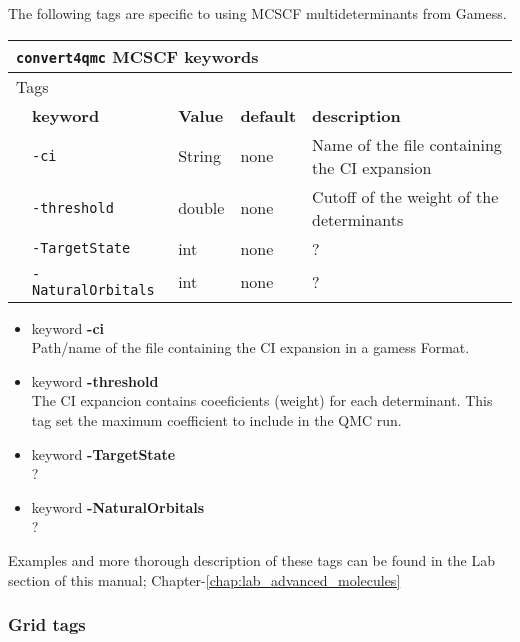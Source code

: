 The following tags are specific to using MCSCF multideterminants from Gamess. 

 \begin{table}[h]
 \begin{center}
 \begin{tabularx}{\textwidth}{l l l l l }
 \hline
 \multicolumn{5}{l}{\texttt{convert4qmc} MCSCF keywords} \\
 \hline
 \multicolumn{2}{l}{Tags}  & \multicolumn{3}{l}{}\\
    &   \bfseries keyword      & \bfseries Value & \bfseries default   & \bfseries description \\
    &   \texttt{-ci    } & String     &   none & Name of the file containing the CI expansion  \\
    &   \texttt{-threshold         } &  double    &  none & Cutoff of the weight of the determinants  \\
    &   \texttt{-TargetState      } & int  &  none & ?  \\
    &   \texttt{-NaturalOrbitals      } &  int      &  none   & ?  \\
    \hline
     \end{tabularx}
 \end{center}
 \end{table}
\begin{itemize}
\item keyword \textbf{-ci}\\
Path/name of the file containing the CI expansion in a gamess Format.
\item keyword \textbf{-threshold}\\
The CI expancion contains coeeficients (weight) for each determinant. This tag set the maximum coefficient to include in the QMC run. 
\item keyword \textbf{-TargetState}\\
?
\item keyword \textbf{-NaturalOrbitals}\\
?
\end{itemize}

Examples and more thorough description of these tags can be found in the Lab section of this manual; Chapter-\ref{chap:lab_advanced_molecules}\\

\subsubsection{Grid tags}
                                          
